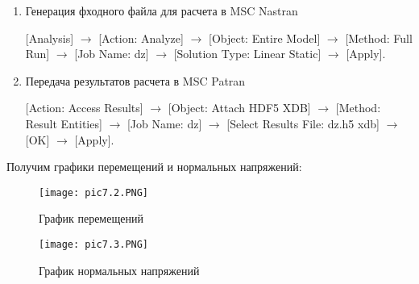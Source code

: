 \begin{enumerate}
     $\rightarrow$ [Action: Create] $\rightarrow$ [Object: Displacement] $\rightarrow$ [Type: Nodal] $\rightarrow$ [New Set Name: dc1] $\rightarrow$ [Input Data] $\rightarrow$ [Translations: <0,0,0> Rotations: <0,0,0>] $\rightarrow$ [OK] $\rightarrow$ [Select Application Region] $\rightarrow$ [Select: Geometry] $\rightarrow$ [Select Geometry Entities: Point 5] $\rightarrow$ [Add] $\rightarrow$ [OK] $\rightarrow$ [Apply]

    [Action: Create] $\rightarrow$ [Object: Displacement] $\rightarrow$ [Type: Nodal] $\rightarrow$ [New Set Name: dc2] $\rightarrow$ [Input Data] $\rightarrow$ [Translations: <,0,0> Rotations: <0,0,0>] $\rightarrow$ [OK] $\rightarrow$ [Select Application Region] $\rightarrow$ [Select: Geometry] $\rightarrow$ [Select Geometry Entities: Point 4] $\rightarrow$ [Add] $\rightarrow$ [OK] $\rightarrow$

    \begin{figure}[H]
        \begin{center}
            \texttt{[image: pic7.1.PNG]}
            \caption{Модель стержня}
            \label{pic7.1}
        \end{center}
    \end{figure}

    \item Генерация фходного файла для расчета в MSC Nastran
    
    [Analysis] $\rightarrow$ [Action: Analyze] $\rightarrow$ [Object: Entire Model] $\rightarrow$ [Method: Full Run] $\rightarrow$ [Job Name: dz] $\rightarrow$ [Solution Type: Linear Static] $\rightarrow$ [Apply].

    \item Передача результатов расчета в MSC Patran
    
    [Action: Access Results] $\rightarrow$ [Object: Attach HDF5 XDB] $\rightarrow$ [Method: Result Entities] $\rightarrow$ [Job Name: dz] $\rightarrow$ [Select Results File: dz.h5 xdb] $\rightarrow$ [OK] $\rightarrow$ [Apply].
\end{enumerate}

Получим графики перемещений и нормальных напряжений:
\begin{figure}[H]
    \begin{center}
        \texttt{[image: pic7.2.PNG]}
        \caption{График перемещений}
        \label{pic7.2}
    \end{center}
\end{figure}
\begin{figure}[H]
    \begin{center}
        \texttt{[image: pic7.3.PNG]}
        \caption{График нормальных напряжений}
        \label{pic7.3}
    \end{center}
\end{figure}

